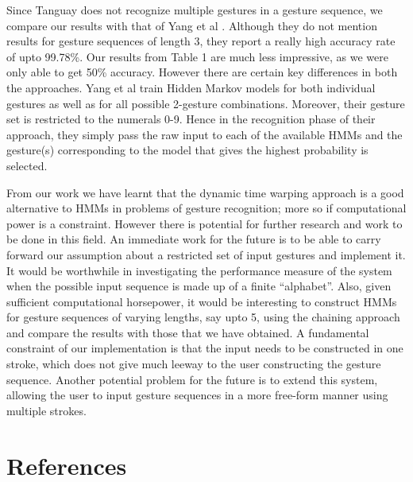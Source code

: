\documentclass[twoside]{article}
\begin{document}
\begin{multicols}{2}
Since Tanguay does not recognize multiple gestures in a gesture sequence, we
compare our results with that of Yang et al \cite{yang_gesture_1994}. Although
they do not mention results for gesture sequences of length 3, they report a
really high accuracy rate of upto 99.78\%. Our results from Table 1 are much
less impressive, as we were only able to get 50\% accuracy. However there are
certain key differences in both the approaches. Yang et al train Hidden Markov
models for both individual gestures as well as for all possible 2-gesture
combinations. Moreover, their gesture set is restricted to the numerals 0-9.
Hence in the recognition phase of their approach, they simply pass the raw input
to each of the available HMMs and the gesture(s) corresponding to the model that
gives the highest probability is selected.

From our work we have learnt that the dynamic time warping approach is a good
alternative to HMMs in problems of gesture recognition; more so if computational
power is a constraint. However there is potential for further research and work
to be done in this field. An immediate work for the future is to be able to
carry forward our assumption about a restricted set of input gestures and
implement it. It would be worthwhile in investigating the performance measure of
the system when the possible input sequence is made up of a finite ``alphabet''.
Also, given sufficient computational horsepower, it would be interesting to
construct HMMs for gesture sequences of varying lengths, say upto 5, using the
chaining approach and compare the results with those that we have obtained. A
fundamental constraint of our implementation is that the input needs to be
constructed in one stroke, which does not give much leeway to the user
constructing the gesture sequence. Another potential problem for the future is
to extend this system, allowing the user to input gesture sequences in a more
free-form manner using multiple strokes.

\section{References}

\begin{spacing}{0.9}
	
%
\begingroup
\renewcommand{\section}[2]{}%

\endgroup
\end{spacing}

\end{multicols}
\end{document}

